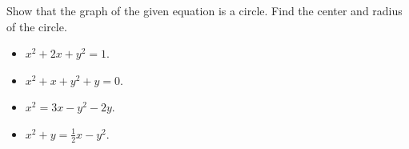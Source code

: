 \begin{frame}
\begin{example}
Show that the graph of the given equation is a circle. Find the center and radius of the circle.

\begin{itemize}
\item $x^2+2x+y^2=1$.
\item $x^2+x+y^2+y=0$.
\item $x^2=3x-y^2-2y$.
\item $x^2+y=\frac{1}{2}x-y^2$.
\end{itemize}
\end{example}
\end{frame}